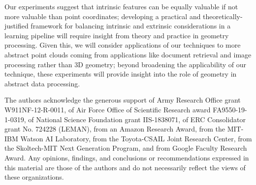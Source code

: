 \documentclass[acmtog]{acmart}
\begin{document}
Our experiments suggest that intrinsic features can be equally valuable if not more valuable than point coordinates; developing a practical and theoretically-justified framework for balancing intrinsic and extrinsic considerations in a learning pipeline will require insight from theory and practice in geometry processing. Given this, we will consider applications of our techniques to more abstract point clouds coming from applications like document retrieval and image processing rather than 3D geometry; beyond broadening the applicability of our technique, these experiments will provide insight into the role of geometry in abstract data processing. \begin{acks}
The authors acknowledge the generous support of Army Research Office grant W911NF-12-R-0011, of Air Force Office of Scientific Research award FA9550-19-1-0319, of National Science Foundation grant IIS-1838071, of ERC Consolidator grant No. 724228 (LEMAN), from an Amazon Research Award,  from the MIT-IBM Watson AI Laboratory, from the Toyota-CSAIL Joint Research Center, from the Skoltech-MIT Next Generation Program, and from Google Faculty Research Award. Any opinions, findings, and conclusions or recommendations expressed in this material are those of the authors and do not necessarily reflect the views of these organizations.
\end{acks} 


\end{document}
